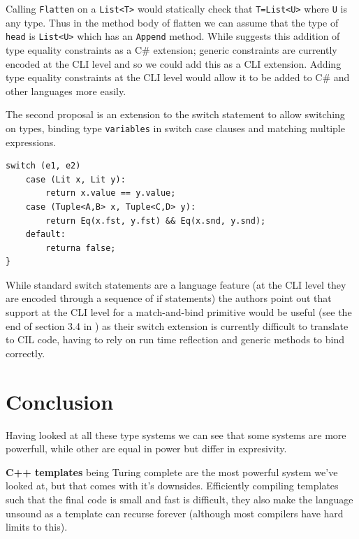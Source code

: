 \documentclass[english]{report}
\begin{document}
Calling \texttt{Flatten} on a \texttt{List<T>} would statically check
that \texttt{T=List<U>} where \texttt{U} is any type. Thus in the
method body of flatten we can assume that the type of \texttt{head}
is \texttt{List<U>} which has an \texttt{Append} method. While \cite{gadts}
suggests this addition of type equality constraints as a C\# extension;
generic constraints are currently encoded at the CLI level and so
we could add this as a CLI extension. Adding type equality constraints
at the CLI level would allow it to be added to C\# and other languages
more easily. 

The second proposal is an extension to the switch statement to allow
switching on types, binding type \texttt{variables} in switch case
clauses and matching multiple expressions.

\begin{lstlisting}[keywordstyle={\color{blue}},language=sharpc]
switch (e1, e2)
	case (Lit x, Lit y):
		return x.value == y.value;
	case (Tuple<A,B> x, Tuple<C,D> y):
		return Eq(x.fst, y.fst) && Eq(x.snd, y.snd);
	default:
		returna false;
}
\end{lstlisting}


While standard switch statements are a language feature (at the CLI
level they are encoded through a sequence of if statements) the authors
point out that support at the CLI level for a match-and-bind primitive
would be useful (see the end of section 3.4 in \cite{gadts}) as their
switch extension is currently difficult to translate to CIL code,
having to rely on run time reflection and generic methods to bind
correctly.




\section{Conclusion}

Having looked at all these type systems we can see that some systems
are more powerfull, while other are equal in power but differ in expresivity.

\textbf{C++ templates} being Turing complete are the most powerful
system we've looked at, but that comes with it's downsides. Efficiently
compiling templates such that the final code is small and fast is
difficult, they also make the language unsound as a template can recurse
forever (although most compilers have hard limits to this).
\end{document}
